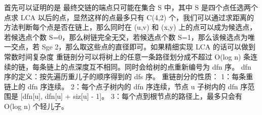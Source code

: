 {}首先可以证明的是 最终交链的端点只可能在集合 \markdownRendererDollarSign{}S\markdownRendererDollarSign{} 中，其中 \markdownRendererDollarSign{}S\markdownRendererDollarSign{} 是四个点任选两个点求 \markdownRendererDollarSign{}LCA\markdownRendererDollarSign{} 以后的点，显然这样的点最多只有 \markdownRendererDollarSign{}C(4,2)\markdownRendererDollarSign{} 个，我们可以通过求距离的方法判断每个点是否在链上，那么同时在 \markdownRendererDollarSign{}(u,v)\markdownRendererDollarSign{} 和 \markdownRendererDollarSign{}(x,y)\markdownRendererDollarSign{} 上的点可以成为候选点，若候选点个数 \markdownRendererDollarSign{}\markdownRendererPipe{}S\markdownRendererPipe{}=0\markdownRendererDollarSign{}，那么树链完全无交，若候选点个数 \markdownRendererDollarSign{}\markdownRendererPipe{}S\markdownRendererPipe{}=1\markdownRendererDollarSign{}，那么该候选点为唯一交点，若 \markdownRendererDollarSign{}\markdownRendererPipe{}S\markdownRendererPipe{}\markdownRendererBackslash{}ge 2\markdownRendererDollarSign{}，那么取这些点的直径即可。如果精细实现 \markdownRendererDollarSign{}LCA\markdownRendererDollarSign{} 的话可以做到常数时间复杂度\markdownRendererInterblockSeparator
{}\markdownRendererInterblockSeparator
{}
\markdownRendererSectionEnd \markdownRendererSectionBegin
{}\markdownRendererInterblockSeparator
{}重链剖分可以将树上的任意一条路径划分成不超过 \markdownRendererDollarSign{}O(\markdownRendererBackslash{}log n)\markdownRendererDollarSign{} 条连续的链，每条链上的点深度互不相同。同时会给树的点重新编号为 \markdownRendererDollarSign{}dfn\markdownRendererDollarSign{} 序。\markdownRendererParagraphSeparator
{}\markdownRendererDollarSign{}dfn\markdownRendererDollarSign{} 序的定义：按先遍历重儿子的顺序得到的 \markdownRendererDollarSign{}dfs\markdownRendererDollarSign{} 序。\markdownRendererParagraphSeparator
{}重链剖分的性质：\markdownRendererParagraphSeparator
{}1：每条重链上的 \markdownRendererDollarSign{}dfn\markdownRendererDollarSign{} 序连续。\markdownRendererHardLineBreak
{}2：每个点子树内的 \markdownRendererDollarSign{}dfn\markdownRendererDollarSign{} 序连续，节点 \markdownRendererDollarSign{}u\markdownRendererDollarSign{} 子树内的 \markdownRendererDollarSign{}dfn\markdownRendererDollarSign{} 序范围是 \markdownRendererDollarSign{}[dfn[u], dfn[u] + siz[u] - 1]\markdownRendererDollarSign{}。\markdownRendererHardLineBreak
{}3：每个点到根节点的路径上，最多只会有 \markdownRendererDollarSign{}O(\markdownRendererBackslash{}log n)\markdownRendererDollarSign{} 个轻儿子。\markdownRendererHardLineBreak
